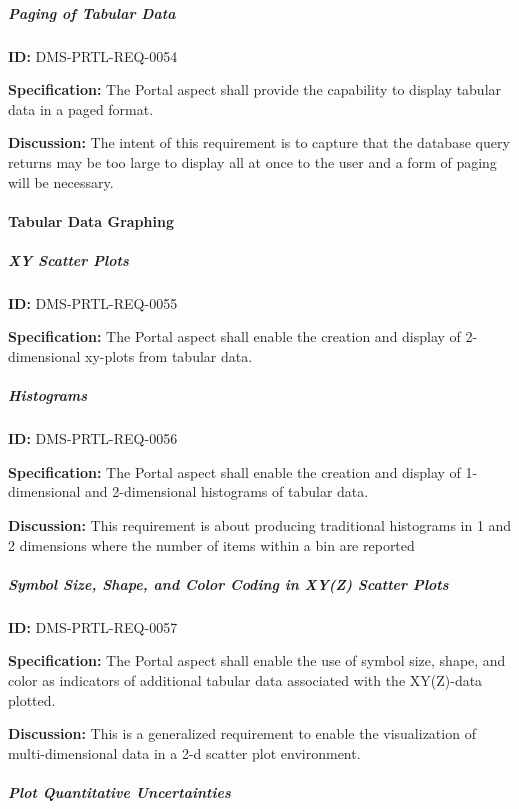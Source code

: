\documentclass[SE,toc]{lsstdoc}
\begin{document}
\subparagraph{Paging of Tabular Data}\hfill  %

\label{DMS-PRTL-REQ-0054}
\textbf{ID:} DMS-PRTL-REQ-0054

\textbf{Specification:}
The Portal aspect shall provide the capability to display tabular data in a paged format.

\textbf{Discussion:}
The intent of this requirement is to capture that the database query returns may be too large to display all at once to the user and a form of paging will be necessary.

\paragraph{Tabular Data Graphing}\hfill  %

\subparagraph{XY Scatter Plots}\hfill  %

\label{DMS-PRTL-REQ-0055}
\textbf{ID:} DMS-PRTL-REQ-0055

\textbf{Specification:}
The Portal aspect shall enable the creation and display of 2-dimensional xy-plots from tabular data.

\subparagraph{Histograms}\hfill  %

\label{DMS-PRTL-REQ-0056}
\textbf{ID:} DMS-PRTL-REQ-0056

\textbf{Specification:}
The Portal aspect shall enable the creation and display of 1-dimensional and 2-dimensional histograms of tabular data.

\textbf{Discussion:}
This requirement is about producing traditional histograms in 1 and 2 dimensions where the number of items within a bin are reported

\subparagraph{Symbol Size, Shape, and Color Coding in XY(Z) Scatter Plots}\hfill  %

\label{DMS-PRTL-REQ-0057}
\textbf{ID:} DMS-PRTL-REQ-0057

\textbf{Specification:}
The Portal aspect shall enable the use of symbol size, shape, and color as indicators of additional tabular data associated with the XY(Z)-data plotted.

\textbf{Discussion:}
This is a generalized requirement to enable the visualization of multi-dimensional data in a 2-d scatter plot environment.

\subparagraph{Plot Quantitative Uncertainties}\hfill  %
\end{document}
